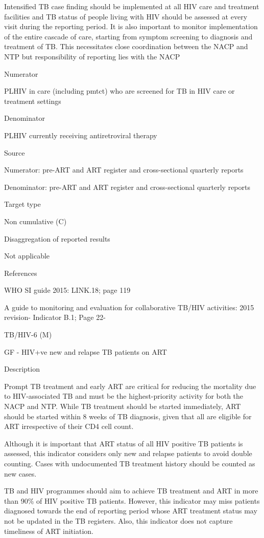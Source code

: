 \documentclass[]{book}
\begin{document}
Intensified TB case finding should be implemented at all HIV care and treatment facilities and TB status of people living with HIV should be assessed at every visit during the reporting period. It is also important to monitor implementation of the entire cascade of care, starting from symptom screening to diagnosis and treatment of TB. This necessitates close coordination between the NACP and NTP but responsibility of reporting lies with the NACP

Numerator

PLHIV in care (including pmtct) who are screened for TB in HIV care or treatment settings

Denominator

PLHIV currently receiving antiretroviral therapy

Source

Numerator: pre-ART and ART register and cross-sectional quarterly reports

Denominator: pre-ART and ART register and cross-sectional quarterly reports

Target type

Non cumulative (C)

Disaggregation of reported results

Not applicable

References

WHO SI guide 2015: LINK.18; page 119

A guide to monitoring and evaluation for collaborative TB/HIV activities: 2015 revision- Indicator B.1; Page 22-

TB/HIV-6 (M)

GF - HIV+ve new and relapse TB patients on ART

Description

Prompt TB treatment and early ART are critical for reducing the mortality due to HIV-associated TB and must be the highest-priority activity for both the NACP and NTP. While TB treatment should be started immediately, ART should be started within 8 weeks of TB diagnosis, given that all are eligible for ART irrespective of their CD4 cell count.

Although it is important that ART status of all HIV positive TB patients is assessed, this indicator considers only new and relapse patients to avoid double counting. Cases with undocumented TB treatment history should be counted as new cases.

TB and HIV programmes should aim to achieve TB treatment and ART in more than 90\% of HIV positive TB patients. However, this indicator may miss patients diagnosed towards the end of reporting period whose ART treatment status may not be updated in the TB registers. Also, this indicator does not capture timeliness of ART initiation.
\end{document}
